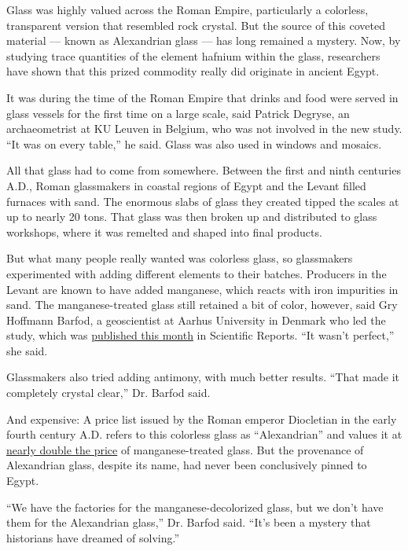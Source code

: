Glass was highly valued across the Roman Empire, particularly a
colorless, transparent version that resembled rock crystal. But the
source of this coveted material --- known as Alexandrian glass --- has
long remained a mystery. Now, by studying trace quantities of the
element hafnium within the glass, researchers have shown that this
prized commodity really did originate in ancient Egypt.

It was during the time of the Roman Empire that drinks and food were
served in glass vessels for the first time on a large scale, said
Patrick Degryse, an archaeometrist at KU Leuven in Belgium, who was not
involved in the new study. ``It was on every table,'' he said. Glass was
also used in windows and mosaics.

All that glass had to come from somewhere. Between the first and ninth
centuries A.D., Roman glassmakers in coastal regions of Egypt and the
Levant filled furnaces with sand. The enormous slabs of glass they
created tipped the scales at up to nearly 20 tons. That glass was then
broken up and distributed to glass workshops, where it was remelted and
shaped into final products.

But what many people really wanted was colorless glass, so glassmakers
experimented with adding different elements to their batches. Producers
in the Levant are known to have added manganese, which reacts with iron
impurities in sand. The manganese-treated glass still retained a bit of
color, however, said Gry Hoffmann Barfod, a geoscientist at Aarhus
University in Denmark who led the study, which was
\href{https://www.nature.com/articles/s41598-020-68089-w}{published this
month} in Scientific Reports. ``It wasn't perfect,'' she said.

Glassmakers also tried adding antimony, with much better results. ``That
made it completely crystal clear,'' Dr. Barfod said.

And expensive: A price list issued by the Roman emperor Diocletian in
the early fourth century A.D. refers to this colorless glass as
``Alexandrian'' and values it at
\href{https://www.cmog.org/article/glass-price-edict-diocletian}{nearly
double the price} of manganese-treated glass. But the provenance of
Alexandrian glass, despite its name, had never been conclusively pinned
to Egypt.

``We have the factories for the manganese-decolorized glass, but we
don't have them for the Alexandrian glass,'' Dr. Barfod said. ``It's
been a mystery that historians have dreamed of solving.''

